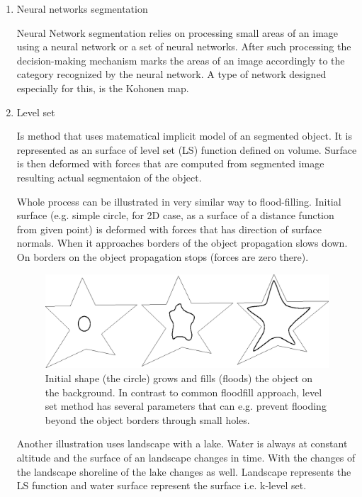 \begin{enumerate}
  \item  Neural networks segmentation

  Neural Network segmentation relies on processing small areas of an image using a neural network or a set of neural networks. After such processing the decision-making mechanism marks the areas of an image accordingly to the category recognized by the neural network. A type of network designed especially for this, is the Kohonen map.

  \item Level set

Is method that uses matematical implicit model of an segmented object. It is represented as an surface of level set (LS) function defined on volume. Surface is then deformed with forces that are computed from segmented image resulting actual segmentaion of the object.

Whole process can be illustrated in very similar way to flood-filling. Initial surface (e.g. simple circle, for 2D case, as a surface of a distance function from given point) is deformed with forces that has direction of surface normals. When it approaches borders of the object propagation slows down. On borders on the object propagation stops (forces are zero there).

\begin{figure}
    \centering
    \includegraphics[width=15cm]{data/flooding.eps}
    \caption[Flooding an object]{Initial shape (the circle) grows and fills (floods) the object on the background. In contrast to common floodfill approach, level set method has several parameters that can e.g. prevent flooding beyond the object borders through small holes.}
    \label{fg:shore}
\end{figure}

Another illustration uses landscape with a lake. Water is always at constant altitude and the surface of an landscape changes in time. With the changes of the landscape shoreline of the lake changes as well. Landscape represents the LS function and water surface represent the surface i.e. k-level set.


\end{enumerate}
